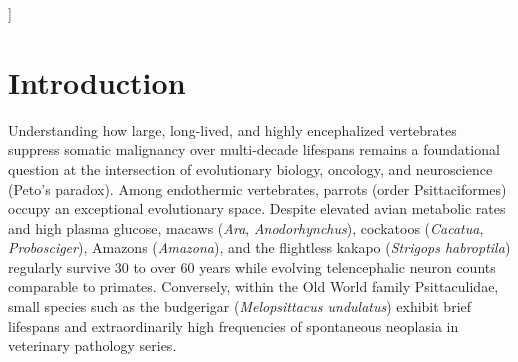 \documentclass[10pt,a4paper,twocolumn]{article}
\begin{document}
{\begin{@twocolumnfalse}
\begin{abstract}
Genome-wide (H6), unadjusted longevity- and brain-associated \texttt{RER} profiles correlate at $r = 0.666$--$0.667$, yet our Red-Team audit reveals that true OLS/branch orthogonalization halves residual brain coupling ($r = 0.332$--$0.389$ vs.\ $0.639$ from unwhitened PGLS residuals), phenotypic covariance depends heavily on Psittaculidae ($r_{\text{tip}}$ drops from $0.478$ to $0.195$), and $89.3\%$ ($117/131$) of shared candidate hits (\texttt{PTEN}, \texttt{MAD2L2}, \texttt{HSPA8}, \texttt{CTNNB1}) have $97$--$99\%$ zero-length branches mirroring the genomic background vector $\pm\sqrt{\text{nv}}$. Partitioning hits into Tier~A (ultra-conserved background-coupled) and Tier~B ($14$ informative genes with $\ge 20$ nonzero branches, led by \texttt{TKT}, \texttt{PHOSPHO1}, \texttt{SLC4A7}, and \texttt{HUS1}) establishes a rigorous benchmark for avian comparative genomics.\par\vspace{4pt}
    \noindent\textbf{Keywords:} Psittaciformes $\cdot$ Peto's Paradox $\cdot$ Longevity $\cdot$ Encephalization $\cdot$ Telomeres (\texttt{RTEL1}, \texttt{TERT}) $\cdot$ \texttt{PTEN} $\cdot$ \texttt{RERconverge} $\cdot$ Statistical Audit
    \end{abstract}
    \vspace{0.2cm}
  \end{@twocolumnfalse}
}]

\section{Introduction}

Understanding how large, long-lived, and highly encephalized vertebrates suppress somatic malignancy over multi-decade lifespans remains a foundational question at the intersection of evolutionary biology, oncology, and neuroscience (Peto's paradox). Among endothermic vertebrates, parrots (order Psittaciformes) occupy an exceptional evolutionary space. Despite elevated avian metabolic rates and high plasma glucose, macaws (\textit{Ara}, \textit{Anodorhynchus}), cockatoos (\textit{Cacatua}, \textit{Probosciger}), Amazons (\textit{Amazona}), and the flightless kakapo (\textit{Strigops habroptila}) regularly survive 30 to over 60 years while evolving telencephalic neuron counts comparable to primates. Conversely, within the Old World family Psittaculidae, small species such as the budgerigar (\textit{Melopsittacus undulatus}) exhibit brief lifespans and extraordinarily high frequencies of spontaneous neoplasia in veterinary pathology series.
\end{document}
